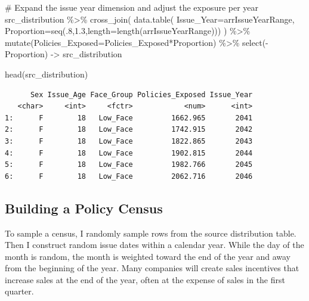 \documentclass[
  letterpaper,
  DIV=11,
  numbers=noendperiod]{scrartcl}
\newenvironment{Shaded}{\begin{snugshade}}{\end{snugshade}}
\newcommand{\AttributeTok}[1]{\textcolor[rgb]{0.40,0.45,0.13}{#1}}
\newcommand{\CommentTok}[1]{\textcolor[rgb]{0.37,0.37,0.37}{#1}}
\newcommand{\DecValTok}[1]{\textcolor[rgb]{0.68,0.00,0.00}{#1}}
\newcommand{\FloatTok}[1]{\textcolor[rgb]{0.68,0.00,0.00}{#1}}
\newcommand{\FunctionTok}[1]{\textcolor[rgb]{0.28,0.35,0.67}{#1}}
\newcommand{\NormalTok}[1]{\textcolor[rgb]{0.00,0.23,0.31}{#1}}
\newcommand{\OtherTok}[1]{\textcolor[rgb]{0.00,0.23,0.31}{#1}}
\newcommand{\SpecialCharTok}[1]{\textcolor[rgb]{0.37,0.37,0.37}{#1}}
\begin{document}
\begin{Shaded}
\begin{Highlighting}[]
\CommentTok{\# Expand the issue year dimension and adjust the exposure per year}
\NormalTok{src\_distribution }\SpecialCharTok{\%\textgreater{}\%}
  \FunctionTok{cross\_join}\NormalTok{(}
    \FunctionTok{data.table}\NormalTok{( }\AttributeTok{Issue\_Year=}\NormalTok{arrIssueYearRange,}
                \AttributeTok{Proportion=}\FunctionTok{seq}\NormalTok{(.}\DecValTok{8}\NormalTok{,}\FloatTok{1.3}\NormalTok{,}\AttributeTok{length=}\FunctionTok{length}\NormalTok{(arrIssueYearRange)))}
\NormalTok{  ) }\SpecialCharTok{\%\textgreater{}\%}
  \FunctionTok{mutate}\NormalTok{(}\AttributeTok{Policies\_Exposed=}\NormalTok{Policies\_Exposed}\SpecialCharTok{*}\NormalTok{Proportion) }\SpecialCharTok{\%\textgreater{}\%}
  \FunctionTok{select}\NormalTok{(}\SpecialCharTok{{-}}\NormalTok{Proportion) }\OtherTok{{-}\textgreater{}}
\NormalTok{  src\_distribution}

\FunctionTok{head}\NormalTok{(src\_distribution)}
\end{Highlighting}
\end{Shaded}

\begin{verbatim}
      Sex Issue_Age Face_Group Policies_Exposed Issue_Year
   <char>     <int>     <fctr>            <num>      <int>
1:      F        18   Low_Face         1662.965       2041
2:      F        18   Low_Face         1742.915       2042
3:      F        18   Low_Face         1822.865       2043
4:      F        18   Low_Face         1902.815       2044
5:      F        18   Low_Face         1982.766       2045
6:      F        18   Low_Face         2062.716       2046
\end{verbatim}

\hypertarget{building-a-policy-census}{%
\subsection{Building a Policy Census}\label{building-a-policy-census}}

To sample a census, I randomly sample rows from the source distribution
table. Then I construct random issue dates within a calendar year. While
the day of the month is random, the month is weighted toward the end of
the year and away from the beginning of the year. Many companies will
create sales incentives that increase sales at the end of the year,
often at the expense of sales in the first quarter.
\end{document}
